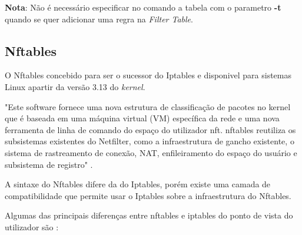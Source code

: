 \textbf{Nota}: Não é necessário especificar no comando a tabela  com o parametro
\textbf{-t} quando se quer adicionar uma regra na \textit{Filter Table}.

\subsection{Nftables}

O Nftables \cite{nftables} concebido para ser o sucessor do Iptables e disponivel para sistemas 
Linux apartir da versão 3.13 do \textit{kernel}.

"Este software fornece uma nova estrutura de classificação de pacotes no kernel 
que é baseada em uma máquina virtual (VM) específica da rede e uma nova ferramenta 
de linha de comando do espaço do utilizador nft. nftables reutiliza os subsistemas 
existentes do Netfilter, como a infraestrutura de gancho existente, o sistema de 
rastreamento de conexão, NAT, enfileiramento do espaço do usuário e subsistema de 
registro" \cite{nftables}.

A sintaxe do Nftables difere da do Iptables, porém existe uma camada de 
compatibilidade que permite usar o Iptables sobre a infraestrutura do Nftables.


Algumas das principais diferenças entre nftables e iptables do ponto de vista do 
utilizador são \cite{diffiptenft}:

